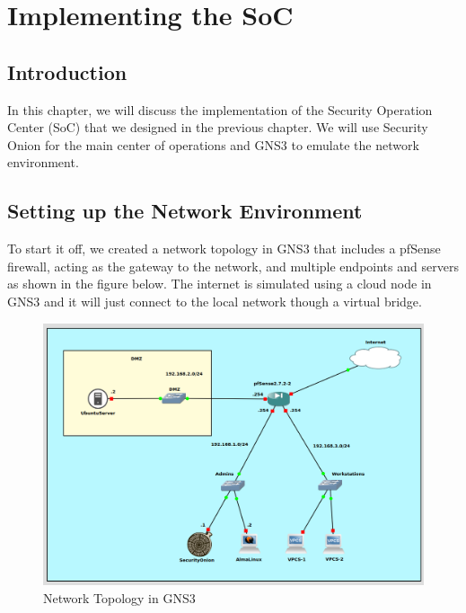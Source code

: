 \chapter{Implementing the SoC}
\minitoc
\newpage

\setcounter{secnumdepth}{0} %
\section{Introduction}
In this chapter, we will discuss the implementation of the Security Operation Center (SoC) that we designed in the previous chapter.
We will use Security Onion for the main center of operations and GNS3 to emulate the network environment.

\setcounter{secnumdepth}{2} %
\section{Setting up the Network Environment}
To start it off, we created a network topology in GNS3 that includes a pfSense firewall, acting as the gateway to the network, and multiple endpoints and servers as shown in the figure below.
The internet is simulated using a cloud node in GNS3 and it will just connect to the local network though a virtual bridge.

\begin{figure}[H]
    \centering
    \includegraphics[width=1\textwidth]{src/assets/images/gns3-topology.png}
    \caption{Network Topology in GNS3}
\end{figure}

